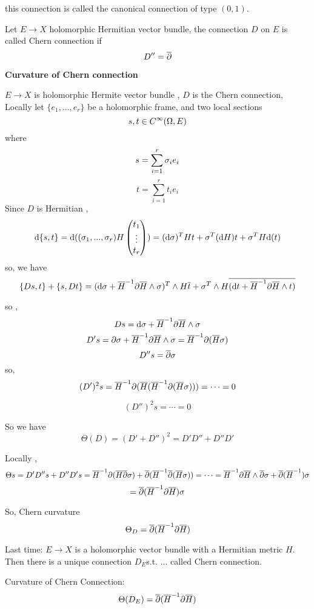 this connection is called the canonical connection of type $(0,1)$.

\begin{definition}
Let $E\to X$ holomorphic Hermitian vector bundle,
the connection $D$ on $E$ is called Chern connection if
$$D''=\overline{\partial}$$
\end{definition}

\textbf{Curvature of Chern connection}

$E\to X$ is holomorphic Hermite vector bundle , $D$ is the Chern connection,
Locally let $\{e_1,...,e_r\}$ be a holomorphic frame, and two local sections
$$s,t\in C^\infty(\Omega, E)$$
where
$$s=\sum_{i=1}^r\sigma_ie_i$$
$$t=\sum_{i=1}^r t_ie_i$$
Since $D$ is Hermitian ,
$$\mathrm{d} \{s,t\}=\mathrm{d} ((\sigma_1,...,\sigma_r)H
\begin{pmatrix}
t_1\\
\vdots\\
t_r
\end{pmatrix})
=(\mathrm{d}\sigma)^THt+\sigma^T(\mathrm{d} H)t+\sigma^TH\mathrm{d}(t)
$$
so, we have
$$\{Ds,t\}+\{s,Dt\}=(\mathrm{d}\sigma+\overline{H}^{-1}\partial\overline{H}\wedge\sigma)^T\wedge H\overline{t}
+\sigma^T\wedge H\overline{(\mathrm{d} t+\overline{H}^{-1}\partial\overline{H}\wedge t)}$$

so ,
$$Ds=\mathrm{d}\sigma+\overline{H}^{-1}\partial\overline{H}\wedge\sigma$$
$$D's=\partial\sigma+\overline{H}^{-1}\partial\overline{H}\wedge\sigma
=\overline{H}^{-1}\partial(\overline{H}\sigma)$$
$$D''s=\overline{\partial}\sigma$$
so,
$$(D')^2s=\overline{H}^{-1}\partial(\overline{H}(\overline{H}^{-1}\partial(\overline{H}\sigma)))
=\cdots=0$$

$$(D'')^2s=\cdots=0$$

So we have
$$\Theta(D)=(D'+D'')^2=D'D''+D''D'$$

Locally ,
$$\Theta s=D'D''s+D''D's=\overline{H}^{-1}\partial(\overline{H}\overline{\partial}\sigma)
+\overline{\partial}(\overline{H}^{-1}\overline{\partial}(\overline{H}\sigma))
=\cdots=\overline{H}^{-1}\partial\overline{H}\wedge\overline{\partial}\sigma
+\overline{\partial}(\overline{H}^{-1})\sigma
$$
$$
  = \overline{\partial}(\overline{H}^{-1}\partial\overline{H})\sigma
$$

So, Chern curvature
$$\Theta_D=\overline{\partial}(\overline{H}^{-1}\partial\overline{H})$$


Last time: $E\to X$ is a holomorphic vector bundle
with a Hermitian metric $H$.
Then there is a unique connection $D_E$s.t. ... called Chern connection.

Curvature of Chern Connection:
$$\Theta(D_E)=\overline{\partial}(\overline{H}^{-1}\partial\overline{H})$$

